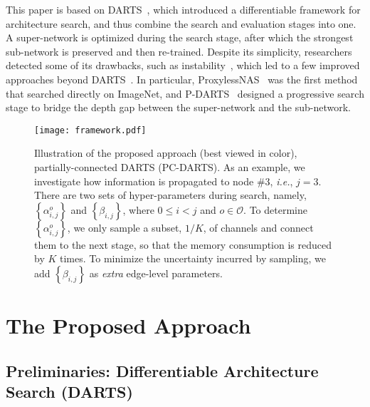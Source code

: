 \documentclass{article} \usepackage{iclr2020_conference,times}
\begin{document}
This paper is based on DARTS~\citep{liu2017hierarchical}, which introduced a differentiable framework for architecture search, and thus combine the search and evaluation stages into one. A super-network is optimized during the search stage, after which the strongest sub-network is preserved and then re-trained. Despite its simplicity, researchers detected some of its drawbacks, such as instability~\citep{Li2019RandomSA,Sciuto2019EvaluatingTS}, which led to a few improved approaches beyond DARTS~\citep{cai2018proxylessnas,chen2019progressive,mei2020atomnas}. In particular, ProxylessNAS~\citep{cai2018proxylessnas} was the first method that searched directly on ImageNet, and P-DARTS~\citep{chen2019progressive} designed a progressive search stage to bridge the depth gap between the super-network and the sub-network.

\begin{figure}[!t]
\renewcommand{\baselinestretch}{1.0}
\centering
\texttt{[image: framework.pdf]}\\
\caption{Illustration of the proposed approach (best viewed in color), partially-connected DARTS (PC-DARTS). As an example, we investigate how information is propagated to node $\#3$, \textit{i.e.}, ${j}={3}$. There are two sets of  hyper-parameters during search, namely, $\left\{\alpha_{i,j}^o\right\}$ and $\left\{\beta_{i,j}\right\}$, where ${0}\leqslant{i}<{j}$ and ${o}\in{\mathcal{O}}$. To determine $\left\{\alpha_{i,j}^o\right\}$, we only sample a subset, $1/K$, of channels and connect them to the next stage, so that the memory consumption is reduced by $K$ times. To minimize the uncertainty incurred by sampling, we add $\left\{\beta_{i,j}\right\}$ as \textit{extra} edge-level parameters.}
\label{fig_framework}
\end{figure}


\section{The Proposed Approach}
\label{Approach}

\subsection{Preliminaries: Differentiable Architecture Search (DARTS)}
\end{document}
